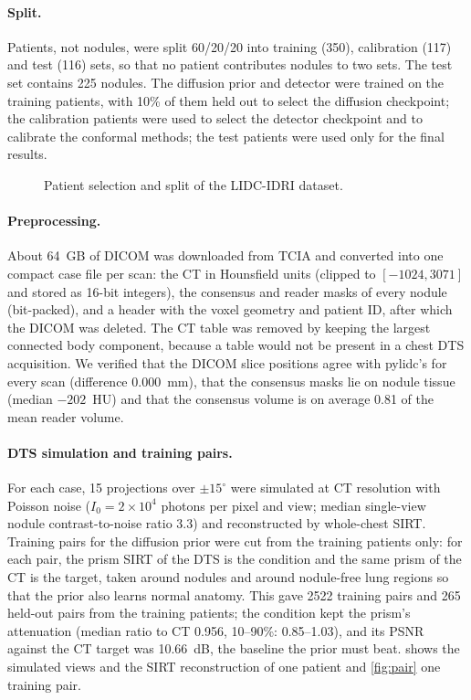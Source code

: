 \paragraph{Split.} Patients, not nodules, were split 60/20/20 into training (350), calibration (117) and test (116) sets, so that no patient contributes nodules to two sets. The test set contains 225 nodules. The diffusion prior and detector were trained on the training patients, with 10\% of them held out to select the diffusion checkpoint; the calibration patients were used to select the detector checkpoint and to calibrate the conformal methods; the test patients were used only for the final results.

\begin{figure}[htbp]
  \centering
  \resizebox{0.78\linewidth}{!}{}
  \caption{Patient selection and split of the LIDC-IDRI dataset.}
  \label{fig:dataset}
\end{figure}

\paragraph{Preprocessing.} About 64~GB of DICOM was downloaded from TCIA and converted into one compact case file per scan: the CT in Hounsfield units (clipped to $[-1024, 3071]$ and stored as 16-bit integers), the consensus and reader masks of every nodule (bit-packed), and a header with the voxel geometry and patient ID, after which the DICOM was deleted. The CT table was removed by keeping the largest connected body component, because a table would not be present in a chest DTS acquisition. We verified that the DICOM slice positions agree with pylidc's for every scan (difference 0.000~mm), that the consensus masks lie on nodule tissue (median $-202$~HU) and that the consensus volume is on average 0.81 of the mean reader volume.

\paragraph{DTS simulation and training pairs.} For each case, 15 projections over $\pm15^\circ$ were simulated at CT resolution with Poisson noise ($I_0 = 2\times10^4$ photons per pixel and view; median single-view nodule contrast-to-noise ratio 3.3) and reconstructed by whole-chest SIRT. Training pairs for the diffusion prior were cut from the training patients only: for each pair, the prism SIRT of the DTS is the condition and the same prism of the CT is the target, taken around nodules and around nodule-free lung regions so that the prior also learns normal anatomy. This gave \num{2522} training pairs and 265 held-out pairs from the training patients; the condition kept the prism's attenuation (median ratio to CT 0.956, 10--90\%: 0.85--1.03), and its PSNR against the CT target was 10.66~dB, the baseline the prior must beat.  shows the simulated views and the SIRT reconstruction of one patient and \cref{fig:pair} one training pair.

